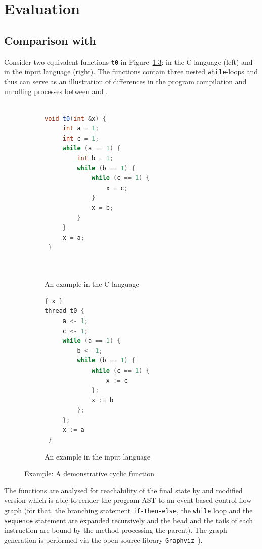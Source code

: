 \chapter{Evaluation}
\label{ch:eval}


\section{Comparison with \porthos[1]}
\label{ch:eval:show}

Consider two equivalent functions \texttt{t0} in Figure~\ref{ex:test-both-cf}: in the C language (left) and in the \porthos[1] input language (right).
The functions contain three nested \texttt{while}-loops and thus can serve as an illustration of differences in the program compilation and unrolling processes between \porthos[1] and \porthos[2].

\begin{figure}[!h]
\begin{subfigure}[b]{.53\textwidth}\centering
\begin{lstlisting}[language=Java,basicstyle=\ttfamily\small]

void t0(int &x) {
     int a = 1;
     int c = 1;
     while (a == 1) {
         int b = 1;
         while (b == 1) {
             while (c == 1) {
                 x = c;
             }
             x = b;
         }
     }
     x = a;
 }
 
 
\end{lstlisting}
\caption{An example in the C language}
\label{ex:both-cf:ptsC}
\end{subfigure}
\begin{subfigure}[b]{.45\textwidth}\centering
\begin{lstlisting}[language=Java,basicstyle=\ttfamily\small]
{ x }
thread t0 {
     a <- 1;
     c <- 1;
     while (a == 1) {
         b <- 1;
         while (b == 1) {
             while (c == 1) {
                 x := c
             };
             x := b
         };
     };
     x := a
 }
\end{lstlisting}
\caption{An example in the \porthos[1] input language}
\label{ex:both-cf:pts1}
\end{subfigure}
\caption{Example: A demonstrative cyclic function}
\label{ex:test-both-cf}
\end{figure}

The functions are analysed for reachability of the final state by \porthos[2] and modified version \porthos[1] which is able to render the program AST to an event-based control-flow graph (for that, the branching statement \texttt{if-then-else}, the \texttt{while} loop and the \texttt{sequence} statement are expanded recursively and the head and the tails of each instruction are bound by the method processing the parent).
The graph generation is performed via the open-source library \texttt{Graphviz}~\cite{ellson2001graphviz}).


